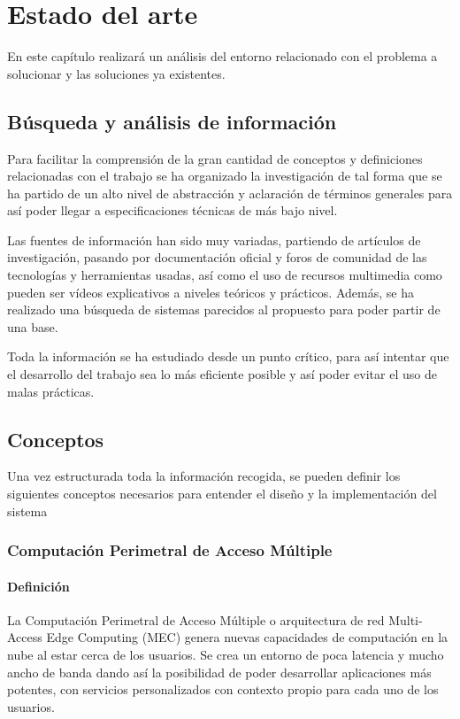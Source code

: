 \chapter{Estado del arte}
En este capítulo realizará un análisis del entorno relacionado con el problema a solucionar y las soluciones ya existentes.

\section{Búsqueda y análisis de información}
Para facilitar la comprensión de la gran cantidad de conceptos y definiciones relacionadas con el trabajo se ha organizado la investigación de tal forma que se ha partido de un alto nivel de abstracción y aclaración de términos generales para así poder llegar a especificaciones técnicas de más bajo nivel.

Las fuentes de información han sido muy variadas, partiendo de artículos de investigación, pasando por documentación oficial y foros de comunidad de las tecnologías y herramientas usadas, así como el uso de recursos multimedia como pueden ser vídeos explicativos a niveles teóricos y prácticos. Además, se ha realizado una búsqueda de sistemas parecidos al propuesto para poder partir de una base.

Toda la información se ha estudiado desde un punto crítico, para así intentar que el desarrollo del trabajo sea lo más eficiente posible y así poder evitar el uso de malas prácticas.

\section{Conceptos}
Una vez estructurada toda la información recogida, se pueden definir los siguientes conceptos necesarios para entender el diseño y la implementación del sistema
\subsection{Computación Perimetral de Acceso Múltiple}
\subsubsection{Definición}
La Computación Perimetral de Acceso Múltiple o arquitectura de red Multi-Access Edge Computing (MEC) genera nuevas capacidades de computación en la nube al estar cerca de los usuarios. Se crea un entorno de poca latencia y mucho ancho de banda dando así la posibilidad de poder desarrollar aplicaciones más potentes, con servicios personalizados con contexto propio para cada uno de los usuarios.

